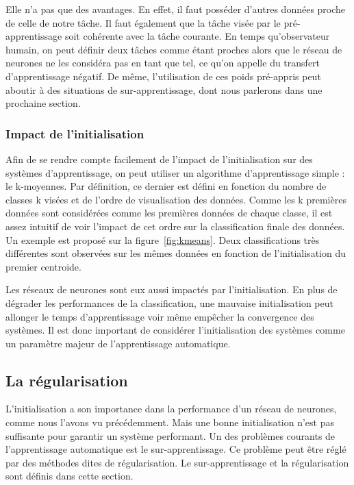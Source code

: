 Elle n'a pas que des avantages. En effet, il faut posséder d'autres données proche de celle de notre tâche. Il faut également que la tâche visée par le pré-apprentissage soit cohérente avec la tâche courante. En temps qu'observateur humain, on peut définir deux tâches comme étant proches alors que le réseau de neurones ne les considéra pas en tant que tel, ce qu'on appelle du transfert d'apprentissage négatif. De même, l'utilisation de ces poids pré-appris peut aboutir à des situations de sur-apprentissage, dont nous parlerons dans une prochaine section.

\subsubsection{Impact de l'initialisation}
Afin de se rendre compte facilement de l'impact de l’initialisation sur des systèmes d'apprentissage, on peut utiliser un algorithme d'apprentissage simple : le k-moyennes. Par définition, ce dernier est défini en fonction du nombre de classes k visées et de l'ordre de visualisation des données. Comme les k premières données sont considérées comme les premières données de chaque classe, il est assez intuitif de voir l'impact de cet ordre sur la classification finale des données. Un exemple est proposé sur la figure~\ref{fig:kmeans}. Deux classifications très différentes sont observées sur les mêmes données en fonction de l’initialisation du premier centroide.


Les réseaux de neurones sont eux aussi impactés par l'initialisation. En plus de dégrader les performances de la classification, une mauvaise initialisation peut allonger le temps d'apprentissage voir même empêcher la convergence des systèmes. Il est donc important de considérer l’initialisation des systèmes comme un paramètre majeur de l'apprentissage automatique.


\subsection{La régularisation}
L’initialisation a son importance dans la performance d'un réseau de neurones, comme nous l'avons vu précédemment. Mais une bonne initialisation n'est pas suffisante pour garantir un système performant. Un des problèmes courants de l'apprentissage automatique est le sur-apprentissage. Ce problème peut être réglé par des méthodes dites de régularisation. Le sur-apprentissage et la régularisation sont définis dans cette section.

